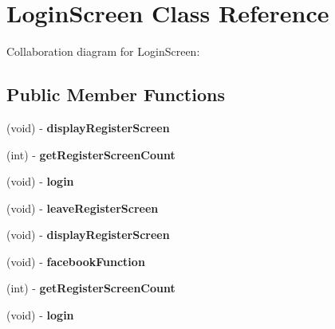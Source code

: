 \hypertarget{interface_login_screen}{
\section{\-Login\-Screen \-Class \-Reference}
\label{interface_login_screen}
}


\-Collaboration diagram for \-Login\-Screen\-:
\subsection*{\-Public \-Member \-Functions}
\begin{DoxyCompactItemize}
\item 
\hypertarget{interface_login_screen_a022c36905972efe848f64c3be27685bc}{
(void) -\/ {\bfseries display\-Register\-Screen}}
\label{interface_login_screen_a022c36905972efe848f64c3be27685bc}

\item 
\hypertarget{interface_login_screen_a52120771fa11410dd3cfe9a08a4bdf7c}{
(int) -\/ {\bfseries get\-Register\-Screen\-Count}}
\label{interface_login_screen_a52120771fa11410dd3cfe9a08a4bdf7c}

\item 
\hypertarget{interface_login_screen_a6d27fd617f1fa2edda55dd647e3a25fb}{
(void) -\/ {\bfseries login}}
\label{interface_login_screen_a6d27fd617f1fa2edda55dd647e3a25fb}

\item 
\hypertarget{interface_login_screen_af1cb4ece822868bd508aa4bb75464a50}{
(void) -\/ {\bfseries leave\-Register\-Screen}}
\label{interface_login_screen_af1cb4ece822868bd508aa4bb75464a50}

\item 
\hypertarget{interface_login_screen_a022c36905972efe848f64c3be27685bc}{
(void) -\/ {\bfseries display\-Register\-Screen}}
\label{interface_login_screen_a022c36905972efe848f64c3be27685bc}

\item 
\hypertarget{interface_login_screen_aaef7b706df5be65d609e801eacf8017f}{
(void) -\/ {\bfseries facebook\-Function}}
\label{interface_login_screen_aaef7b706df5be65d609e801eacf8017f}

\item 
\hypertarget{interface_login_screen_a52120771fa11410dd3cfe9a08a4bdf7c}{
(int) -\/ {\bfseries get\-Register\-Screen\-Count}}
\label{interface_login_screen_a52120771fa11410dd3cfe9a08a4bdf7c}

\item 
\hypertarget{interface_login_screen_a6d27fd617f1fa2edda55dd647e3a25fb}{
(void) -\/ {\bfseries login}}
\label{interface_login_screen_a6d27fd617f1fa2edda55dd647e3a25fb}


\end{DoxyCompactItemize}
